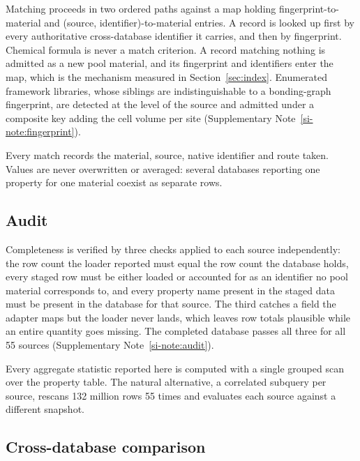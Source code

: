 Matching proceeds in two ordered paths against a map holding
fingerprint-to-material and (source, identifier)-to-material entries. A record is
looked up first by every authoritative cross-database identifier it carries, and
then by fingerprint. Chemical formula is never a match criterion. A record
matching nothing is admitted as a new pool material, and its fingerprint and
identifiers enter the map, which is the mechanism measured in
Section~\ref{sec:index}. Enumerated framework libraries, whose siblings are
indistinguishable to a bonding-graph fingerprint, are detected at the level of
the source and admitted under a composite key adding the cell volume per site
(Supplementary Note~\ref{si-note:fingerprint}).

Every match records the material, source, native identifier and route taken.
Values are never overwritten or averaged: several databases reporting one
property for one material coexist as separate rows.

\subsection{Audit}

Completeness is verified by three checks applied to each source independently:
the row count the loader reported must equal the row count the database holds, every
staged row must be either loaded or accounted for as an identifier no pool
material corresponds to, and every property name present in the staged data must
be present in the database for that source. The third catches a field the adapter
maps but the loader never lands, which leaves row totals plausible while an
entire quantity goes missing. The completed database passes all three for all 55
sources (Supplementary Note~\ref{si-note:audit}).

Every aggregate statistic reported here is computed with a single grouped scan
over the property table. The natural alternative, a correlated subquery per
source, rescans 132 million rows 55 times and evaluates each source against a
different snapshot.

\subsection{Cross-database comparison}

